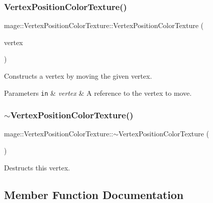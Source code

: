 \subsubsection{\texorpdfstring{Vertex\+Position\+Color\+Texture()}{VertexPositionColorTexture()}\hspace{0.1cm}{\footnotesize\ttfamily [4/4]}}
{\footnotesize\ttfamily mage\+::\+Vertex\+Position\+Color\+Texture\+::\+Vertex\+Position\+Color\+Texture (\begin{DoxyParamCaption}\item[{\hyperlink{structmage_1_1_vertex_position_color_texture}{Vertex\+Position\+Color\+Texture} \&\&}]{vertex }\end{DoxyParamCaption})\hspace{0.3cm}{\ttfamily [default]}}

Constructs a vertex by moving the given vertex.


\begin{DoxyParams}[1]{Parameters}
\mbox{\tt in}  & {\em vertex} & A reference to the vertex to move. \\
\hline
\end{DoxyParams}
\hypertarget{structmage_1_1_vertex_position_color_texture_a07cc697a88ef1a75ef64aadac9945c11}{}\label{structmage_1_1_vertex_position_color_texture_a07cc697a88ef1a75ef64aadac9945c11} 
\subsubsection{\texorpdfstring{$\sim$\+Vertex\+Position\+Color\+Texture()}{~VertexPositionColorTexture()}}
{\footnotesize\ttfamily mage\+::\+Vertex\+Position\+Color\+Texture\+::$\sim$\+Vertex\+Position\+Color\+Texture (\begin{DoxyParamCaption}{ }\end{DoxyParamCaption})\hspace{0.3cm}{\ttfamily [default]}}

Destructs this vertex. 

\subsection{Member Function Documentation}
\hypertarget{structmage_1_1_vertex_position_color_texture_a3eeee863375fee721cbb8e516a582a1e}{}\label{structmage_1_1_vertex_position_color_texture_a3eeee863375fee721cbb8e516a582a1e} 
